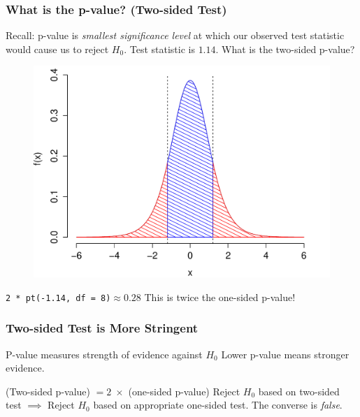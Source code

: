 \begin{frame}
\frametitle{What is the p-value? (Two-sided Test)}
\footnotesize
Recall: p-value is \emph{smallest significance level} at which our observed test statistic would cause us to reject $H_0$. \alert{Test statistic is $1.14$. What is the two-sided p-value? }
\begin{figure}
\includegraphics[scale= 0.4]{./images/p_both5}
\end{figure}

\texttt{2 * pt(-1.14, df = 8)}$\approx 0.28$ \pause \hfill \alert{This is twice the one-sided p-value!}
\end{frame}


\begin{frame}
\frametitle{Two-sided Test is More Stringent}
\begin{block}{P-value measures strength of evidence against $H_0$}
Lower p-value means stronger evidence. 
\end{block}

\begin{block}{(Two-sided p-value) $= 2 \; \times$  (one-sided p-value)}
Reject $H_0$ based on two-sided test $\implies$ Reject $H_0$ based on appropriate one-sided test. The converse is \emph{false}.
\end{block}


\end{frame}

